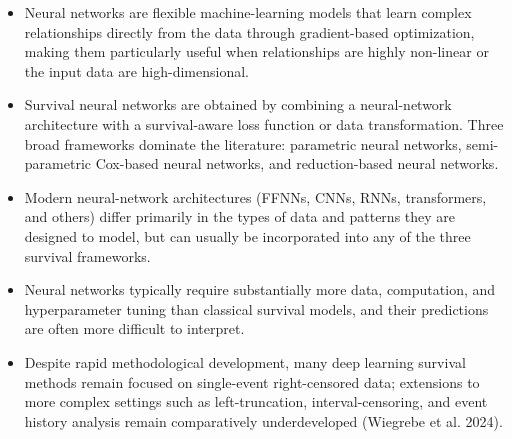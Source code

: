 \documentclass[
  letterpaper,
  krantz2]{style/krantz}
\providecommand{\tightlist}{%
  \setlength{\itemsep}{0pt}\setlength{\parskip}{0pt}}
\begin{document}
\begin{tcolorbox}[enhanced jigsaw, toprule=.15mm, bottomtitle=1mm, opacityback=0, breakable, leftrule=.75mm, title={Key takeaways}, toptitle=1mm, bottomrule=.15mm, colback=white, colframe=quarto-callout-warning-color-frame, titlerule=0mm, opacitybacktitle=0.6, coltitle=black, rightrule=.15mm, left=2mm, colbacktitle=quarto-callout-warning-color!10!white, arc=.35mm]

\begin{itemize}
\tightlist
\item
  Neural networks are flexible machine-learning models that learn
  complex relationships directly from the data through gradient-based
  optimization, making them particularly useful when relationships are
  highly non-linear or the input data are high-dimensional.
\item
  Survival neural networks are obtained by combining a neural-network
  architecture with a survival-aware loss function or data
  transformation. Three broad frameworks dominate the literature:
  parametric neural networks, semi-parametric Cox-based neural networks,
  and reduction-based neural networks.
\item
  Modern neural-network architectures (FFNNs, CNNs, RNNs, transformers,
  and others) differ primarily in the types of data and patterns they
  are designed to model, but can usually be incorporated into any of the
  three survival frameworks.
\item
  Neural networks typically require substantially more data,
  computation, and hyperparameter tuning than classical survival models,
  and their predictions are often more difficult to interpret.
\item
  Despite rapid methodological development, many deep learning survival
  methods remain focused on single-event right-censored data; extensions
  to more complex settings such as left-truncation, interval-censoring,
  and event history analysis remain comparatively underdeveloped
  (Wiegrebe et al. 2024).
\end{itemize}

\end{tcolorbox}
\end{document}
